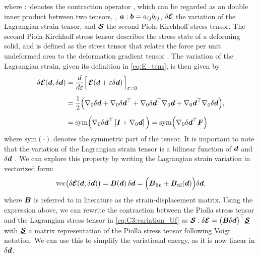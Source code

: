%	
where $:$ denotes the contraction operator \cite{Kim2018,Holzapfel2002}, which can be regarded as an double inner product between two tensors, \ie, ${\boldsymbol{a}} : {\boldsymbol{b}} = a_{ij} b_{ij}$, $\delta \boldsymbol{\mathcal{E}}$ the variation of the Lagrangian strain tensor, and $\boldsymbol{\mathcal{S}}$ the second Piola-Kirchhoff stress tensor. The second Piola-Kirchhoff stress tensor describes the stress state of a deforming solid, and is defined as the stress tensor that relates the force per unit undeformed area to the deformation gradient tensor \cite{Holzapfel2002}. %
The variation of the Lagrangian strain, given its definition in \eqref{eq:E_tens}, is then given by
%
\begin{align}
\delta \boldsymbol{\mathcal{E}}({\boldsymbol{d}}, \delta {\boldsymbol{d}}) & = \frac{d}{d\varepsilon} \Big[ \,\boldsymbol{\mathcal{E}} ({\boldsymbol{d}} + \varepsilon \delta {\boldsymbol{d}}) \, \Big]_{\varepsilon = 0} \notag  \\[0.5em]
& = \frac{1}{2} \Big(\nabla_0 \delta {\boldsymbol{d}} + \nabla_0 \delta {\boldsymbol{d}}^\top + \nabla_0 \delta {\boldsymbol{d}}^\top \nabla_0 {\boldsymbol{d}} + \nabla_0{\boldsymbol{d}}^\top \nabla_0  \delta {\boldsymbol{d}}  \Big), \notag \\[0.5em]
& = \textrm{sym}\Big(\nabla_0 \delta {\boldsymbol{d}}^\top \left[{\boldsymbol{I}} +  \nabla_0 {\boldsymbol{d}} \right] \Big) = \textrm{sym} \Big( \nabla_0 \delta {\boldsymbol{d}}^\top {\boldsymbol{F}} \Big)
\label{eq:C3:variation_Uf}
\end{align}
%
where $\textrm{sym}(\cdot)$ denotes the symmetric part of the tensor. It is important to note that the variation of the Lagrangian strain tensor is a bilinear function of ${\boldsymbol{d}}$ and $\delta {\boldsymbol{d}}$ \cite{Kim2018}. We can explore this property by writing the Lagrangian strain variation in vectorized form:
%
\begin{equation}
\textrm{vec}\big(\delta \boldsymbol{\mathcal{E}}({\boldsymbol{d}},\delta {\boldsymbol{d}})\big) = {\boldsymbol{B}}({\boldsymbol{d}}) \, \delta {\boldsymbol{d}} = \Big({\boldsymbol{B}}_{\textrm{lin}} + {\boldsymbol{B}}_{\textrm{nl}}({\boldsymbol{d}}) \Big) \delta {\boldsymbol{d}},
\end{equation}
% 
where ${\boldsymbol{B}}$ is referred to in literature as the strain-displacement matrix. Using the expression above, we can rewrite the contraction between the Piolla stress tensor and the Lagrangian stress tensor in \eqref{eq:C3:variation_Uf} as $\boldsymbol{\mathcal{S}} : \delta \boldsymbol{\mathcal{E}} = \big({\boldsymbol{B}} \delta {\boldsymbol{d}}\big)^\top \underline{\boldsymbol{\mathcal{S}}}$ with $\underline{\boldsymbol{\mathcal{S}}}$ a matrix representation of the Piolla stress tensor following Voigt notation. We can use this to simplify the variational energy, as it is now linear in $\delta {\boldsymbol{d}}$. 

